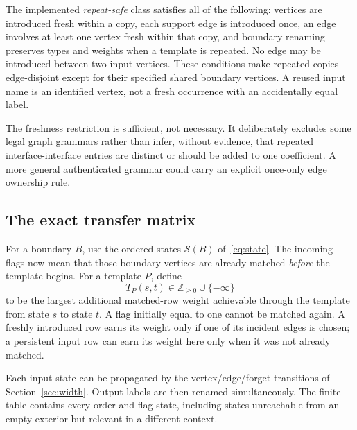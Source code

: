 \documentclass[11pt,a4paper]{article}
\theoremstyle{definition}
\theoremstyle{remark}
\newcommand{\Z}{\mathbb Z}
\newcommand{\mi}{-\infty}
\newcommand{\calS}{\mathcal S}
\begin{document}
The implemented \emph{repeat-safe} class satisfies all of the following:
vertices are introduced fresh within a copy, each support edge is introduced
once, an edge involves at least one vertex fresh within that copy, and
boundary renaming preserves types and weights when a template is repeated.
No edge may be introduced between two input vertices. These conditions
make repeated copies edge-disjoint except for their specified shared
boundary vertices. A reused input name is an identified vertex, not a
fresh occurrence with an accidentally equal label.

The freshness restriction is sufficient, not necessary. It deliberately
excludes some legal graph grammars rather than infer, without evidence,
that repeated interface-interface entries are distinct or should be added
to one coefficient. A more general authenticated grammar could carry an
explicit once-only edge ownership rule.

\subsection{The exact transfer matrix}
For a boundary $B$, use the ordered states $\calS(B)$
of~\eqref{eq:state}. The incoming flags now mean that those boundary
vertices are already matched \emph{before} the template begins.
For a template $P$, define
\[
 T_P(s,t)\in\Z_{\geq0}\cup\{\mi\}
\]
to be the largest additional matched-row weight achievable through the
template from state $s$ to state $t$. A flag initially equal to one cannot
be matched again. A freshly introduced row earns its weight only if one
of its incident edges is chosen; a persistent input row can earn its
weight here only when it was not already matched.

Each input state can be propagated by the vertex/edge/forget transitions
of Section~\ref{sec:width}. Output labels are then renamed simultaneously.
The finite table contains every order and flag state, including states
unreachable from an empty exterior but relevant in a different context.
\end{document}
